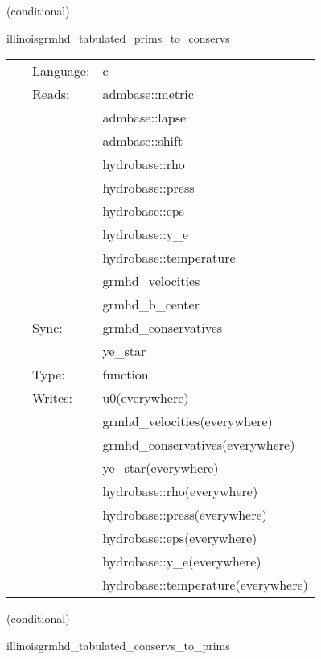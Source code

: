 \documentclass{article}
\begin{document}
\vspace{5mm}

   (conditional) 

\hspace{5mm} illinoisgrmhd\_tabulated\_prims\_to\_conservs 

\hspace{5mm}{\it tabulated version of illinoisgrmhd\_prims\_to\_conservs } 


\hspace{5mm}

 \begin{tabular*}{160mm}{cll} 
~ & Language:  & c \\ 
~ & Reads:  & admbase::metric \\ 
~& ~ &admbase::lapse\\ 
~& ~ &admbase::shift\\ 
~& ~ &hydrobase::rho\\ 
~& ~ &hydrobase::press\\ 
~& ~ &hydrobase::eps\\ 
~& ~ &hydrobase::y\_e\\ 
~& ~ &hydrobase::temperature\\ 
~& ~ &grmhd\_velocities\\ 
~& ~ &grmhd\_b\_center\\ 
~ & Sync:  & grmhd\_conservatives \\ 
~& ~ &ye\_star\\ 
~ & Type:  & function \\ 
~ & Writes:  & u0(everywhere) \\ 
~& ~ &grmhd\_velocities(everywhere)\\ 
~& ~ &grmhd\_conservatives(everywhere)\\ 
~& ~ &ye\_star(everywhere)\\ 
~& ~ &hydrobase::rho(everywhere)\\ 
~& ~ &hydrobase::press(everywhere)\\ 
~& ~ &hydrobase::eps(everywhere)\\ 
~& ~ &hydrobase::y\_e(everywhere)\\ 
~& ~ &hydrobase::temperature(everywhere)\\ 
\end{tabular*} 


\vspace{5mm}

   (conditional) 

\hspace{5mm} illinoisgrmhd\_tabulated\_conservs\_to\_prims 
\end{document}
